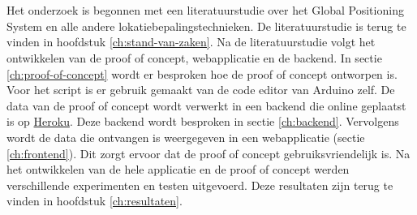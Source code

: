 
\chapter{}
\label{ch:methodologie}

Het onderzoek is begonnen met een literatuurstudie over het Global Positioning System en alle andere lokatiebepalingstechnieken. De literatuurstudie is terug te vinden in hoofdstuk \ref{ch:stand-van-zaken}.
\newline
\newline
Na de literatuurstudie volgt het ontwikkelen van de proof of concept, webapplicatie en de backend. In sectie \ref{ch:proof-of-concept} wordt er besproken hoe de proof of concept ontworpen is. Voor het script is er gebruik gemaakt van de code editor van Arduino zelf. 
\newline
\newline
De data van de proof of concept wordt verwerkt in een backend die online geplaatst is op \href{www.heroku.com}{Heroku}. Deze backend wordt besproken in sectie \ref{ch:backend}.
\newline
\newline
Vervolgens wordt de data die ontvangen is weergegeven in een webapplicatie (sectie \ref{ch:frontend}). Dit zorgt ervoor dat de proof of concept gebruiksvriendelijk is. 
\newline
\newline
Na het ontwikkelen van de hele applicatie en de proof of concept werden verschillende experimenten en testen uitgevoerd. Deze resultaten zijn terug te vinden in hoofdstuk \ref{ch:resultaten}.


